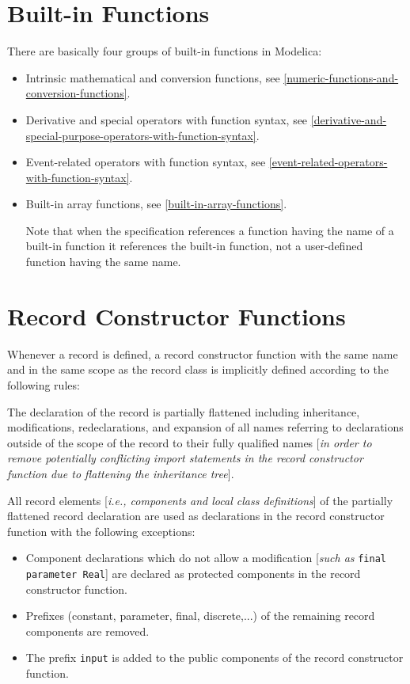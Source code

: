 \section{Built-in Functions}

There are basically four groups of built-in functions in Modelica:

\begin{itemize}
\item
  Intrinsic mathematical and conversion functions, see \autoref{numeric-functions-and-conversion-functions}.
\item
  Derivative and special operators with function syntax,
  see \autoref{derivative-and-special-purpose-operators-with-function-syntax}.
\item
  Event-related operators with function syntax, see \autoref{event-related-operators-with-function-syntax}.
\item
  Built-in array functions, see \autoref{built-in-array-functions}.

  Note that when the specification references a function having the name
  of a built-in function it references the built-in function, not a
  user-defined function having the same name.
\end{itemize}

\section{Record Constructor Functions}

Whenever a record is defined, a record constructor function with the
same name and in the same scope as the record class is implicitly
defined according to the following rules:

The declaration of the record is partially flattened including
inheritance, modifications, redeclarations, and expansion of all names
referring to declarations outside of the scope of the record to their
fully qualified names {[}\emph{in order to remove potentially
conflicting import statements in the record constructor function due to
flattening the inheritance tree}{]}.

All record elements {[}\emph{i.e., components and local class
definitions}{]} of the partially flattened record declaration are used
as declarations in the record constructor function with the following
exceptions:

\begin{itemize}
\item
  Component declarations which do not allow a modification {[}\emph{such
  as} \lstinline!final parameter Real!{]} are declared
  as protected components in the record constructor function.
\item
  Prefixes (constant, parameter, final, discrete,...) of the remaining
  record components are removed.
\item
  The prefix \lstinline!input! is added to the public components of the record
  constructor function.
\end{itemize}

